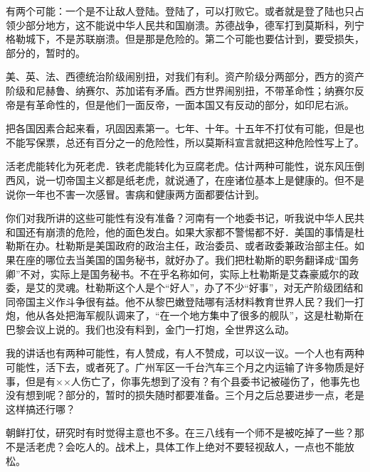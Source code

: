 有两个可能：一个是不让敌人登陆。登陆了，可以打败它。或者就是登了陆也只占领少部分地方，这不能说中华人民共和国崩溃。苏德战争，德军打到莫斯科，列宁格勒城下，不是苏联崩溃。但是那是危险的。第二个可能也要估计到，要受损失，部分的，暂时的。

美、英、法、西德统治阶级闹别扭，对我们有利。资产阶级分两部分，西方的资产阶级和尼赫鲁、纳赛尔、苏加诺有矛盾。西方世界闹别扭，不带革命性；纳赛尔反帝是有革命性的，但是他们一面反帝，一面本国又有反动的部分，如印尼右派。

把各国因素合起来看，巩固因素第一。七年、十年。十五年不打仗有可能，但是也不能写保票，总还有百分之一的危险性，所以莫斯科宣言就把这种危险性写上了。

活老虎能转化为死老虎．铁老虎能转化为豆腐老虎。估计两种可能性，说东风压倒西风，说一切帝国主义都是纸老虎，就说通了，在座诸位基本上是健康的。但不是说你一年也不害一次感冒。害病和健康两方面都要估计到。

你们对我所讲的这些可能性有没有准备？河南有一个地委书记，听我说中华人民共和国还有崩溃的危险，他的面色发白。如果大家都不警惕都不好．美国的事情是杜勒斯在办。杜勒斯是美国政府的政治主任，政治委员、或者政委兼政治部主任。如果在座的哪位去当美国的国务秘书，就好办了。我们把杜勒斯的职务翻译成“国务卿”不对，实际上是国务秘书。不在乎名称如何，实际上杜勒斯是艾森豪威尔的政委，是艾的灵魂。杜勒斯这个人是个“好人”，办了不少“好事”，对无产阶级团结和同帝国主义作斗争很有益。他不从黎巴嫩登陆哪有活材料教育世界人民？我们一打炮，他从各处把海军舰队调来了，“在一个地方集中了很多的舰队”，这是杜勒斯在巴黎会议上说的。我们也没有料到，金门一打炮，全世界这么动。

我的讲话也有两种可能性，有人赞成，有人不赞成，可以议一议。一个人也有两种可能性，活下去，或者死了。广州军区一千台汽车三个月之内运输了许多物质是好事，但是有××人伤亡了，你事先想到了没有？有个县委书记被碰伤了，他事先也没有想到呢？部分的，暂时的损失随时都要准备。三个月之后总要进步一点，老是这样搞还行哪？

朝鲜打仗，研究时有时觉得主意也不多。在三八线有一个师不是被吃掉了一些？那不是活老虎？会吃人的。战术上，具体工作上绝对不要轻视敌人，一点也不能放松。


